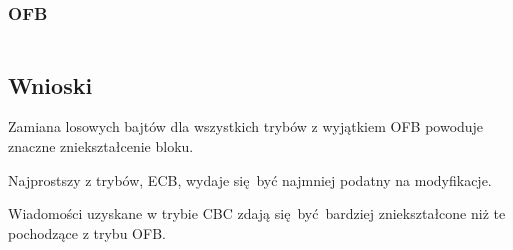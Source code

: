 \documentclass[12pt]{article}
\newenvironment*{dummyenv}{}{}
\begin{document}
\subsubsection{OFB}

\begin{dummyenv}
	\inputminted[breaklines,firstline=1,lastline=51]{yaml}{2-mangled-ofb.txt}
\end{dummyenv}

\subsection{Wnioski}

Zamiana losowych bajtów dla wszystkich trybów z wyjątkiem OFB powoduje
znaczne zniekształcenie bloku.

Najprostszy z trybów, ECB, wydaje się być najmniej podatny na modyfikacje.

Wiadomości uzyskane w trybie CBC zdają się być bardziej zniekształcone niż te
pochodzące z trybu OFB.
\end{document}
